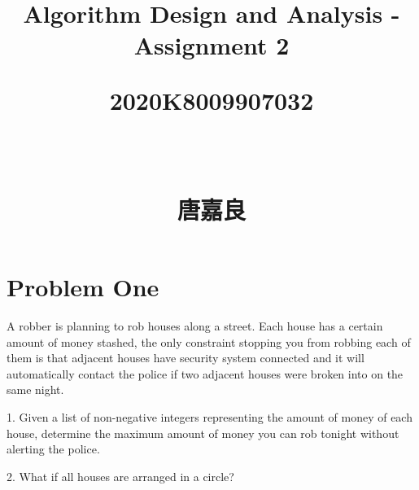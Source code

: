 \documentclass{article}
\begin{document}
\title{Algorithm Design and Analysis - Assignment 2\\ [0.5ex] \begin{large} 2020K8009907032 \end{large}\\ [0.5ex] \begin{large} 唐嘉良 \end{large}}
\maketitle
\tableofcontents


\newpage
\section{Problem One}
A robber is planning to rob houses along a street. Each house has a certain amount of money 
stashed, the only constraint stopping you from robbing each of them is that adjacent houses have 
security system connected and it will automatically contact the police if two adjacent houses were 
broken into on the same night. 


1. Given a list of non-negative integers representing the amount of money of each house, 
determine the maximum amount of money you can rob tonight without alerting the police. 


2. What if all houses are arranged in a circle?
\end{document}
